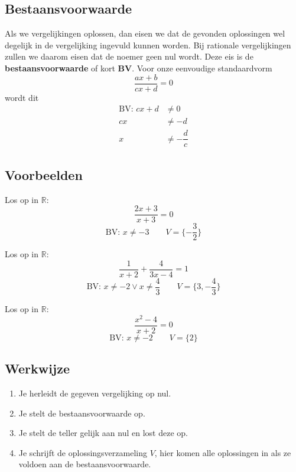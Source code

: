 \documentclass[12pt]{article}
\begin{document}
\begin{theorie}

\subsection{Bestaansvoorwaarde}
Als we vergelijkingen oplossen, dan eisen we dat de gevonden oplossingen wel degelijk in de vergelijking ingevuld kunnen worden. Bij rationale vergelijkingen zullen we daarom eisen dat de noemer geen nul wordt. Deze eis is de {\bf bestaansvoorwaarde} of kort {\bf BV}. Voor onze eenvoudige standaardvorm
$$\dfrac{ax+b}{cx+d}=0$$
wordt dit
\begin{align*}
  \mbox{BV: } cx+d &\neq 0\\
                cx &\neq -d\\
                 x &\neq -\dfrac{d}{c}
\end{align*}


\subsection{Voorbeelden}

Los op in $\mathbb{R}$:
$$\frac{2x+3}{x+3} = 0$$
$$\mbox{BV: }x\neq -3 \qquad V=\{-\dfrac{3}{2}\}$$


Los op in $\mathbb{R}$:
$$\frac{1}{x+2}+\frac{4}{3x-4}=1$$
$$\mbox{BV: }x\neq -2 \vee x\neq \dfrac{4}{3} \qquad V=\{3,-\dfrac{4}{3}\}$$

Los op in $\mathbb{R}$:
$$\frac{x^2-4}{x+2}=0$$
$$\mbox{BV: }x\neq -2 \qquad V=\{2\}$$

\subsection{Werkwijze}
\begin{enumerate}[(1)]
  \item Je herleidt de gegeven vergelijking op nul.
  \item Je stelt de bestaansvoorwaarde op.
  \item Je stelt de teller gelijk aan nul en lost deze op.
  \item Je schrijft de oplossingsverzameling $V$, hier komen alle oplossingen in als ze voldoen aan de bestaansvoorwaarde.
\end{enumerate}

\end{theorie}
\end{document}
